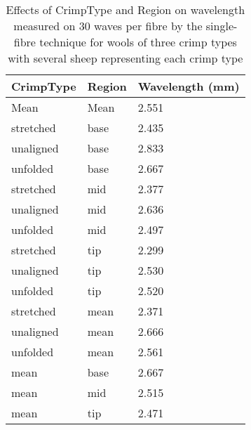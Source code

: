 %

\begin{table}[htp]
\centering
\caption{Effects of CrimpType and Region on wavelength  measured on 30 waves per fibre by the single-fibre technique for wools of three crimp types with several sheep representing each crimp type}
\label{tab:sfwavlint}
\vspace{0.1in}
\begin{tabular}{|p{1.0in}|p{1.0in}|p{0.9in}|} \hline
     CrimpType  & Region & Wavelength (mm) \\  \hline
 Mean &  Mean       & 2.551  \\ \hline
  stretched     & base & 2.435          \\
  unaligned     & base & 2.833          \\
  unfolded     &  base & 2.667          \\ \hline
  stretched     & mid & 2.377     \\
  unaligned     & mid & 2.636     \\
  unfolded     &  mid & 2.497     \\ \hline
  stretched     & tip & 2.299        \\
  unaligned     & tip & 2.530        \\
  unfolded      & tip & 2.520        \\ \hline
  stretched     & mean & 2.371 \\
  unaligned     & mean & 2.666 \\
  unfolded      & mean & 2.561 \\ \hline
  mean          & base & 2.667 \\
  mean          & mid  & 2.515 \\
  mean          & tip  & 2.471 \\ \hline
\end{tabular}
\end{table}

%
